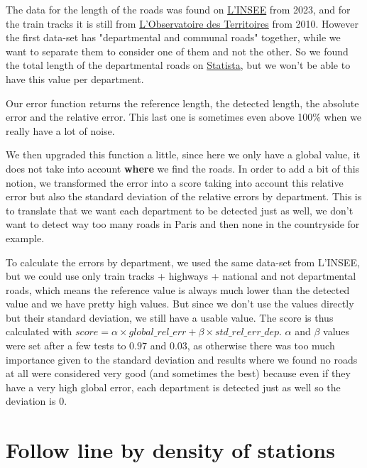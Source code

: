 \documentclass[main.tex]{subfiles}
\begin{document}
The data for the length of the roads was found on \href{https://www.insee.fr/fr/statistiques/2012705#tableau-TCRD_076_tab1_departements}{L'INSEE} from 2023, and for the train tracks it is still from \href{https://www.observatoire-des-territoires.gouv.fr/longueur-des-lignes-ferroviaires-en-service}{L'Observatoire des Territoires} from 2010. However the first data-set has "departmental and communal roads" together, while we want to separate them to consider one of them and not the other. So we found the total length of the departmental roads on \href{https://fr.statista.com/statistiques/540868/longueur-routes-france-par-type/}{Statista}, but we won't be able to have this value per department.

Our error function returns the reference length, the detected length, the absolute error and the relative error. This last one is sometimes even above 100\% when we really have a lot of noise. 

\hfill

We then upgraded this function a little, since here we only have a global value, it does not take into account \textbf{where} we find the roads. In order to add a bit of this notion, we transformed the error into a score taking into account this relative error but also the standard deviation of the relative errors by department. This is to translate that we want each department to be detected just as well, we don't want to detect way too many roads in Paris and then none in the countryside for example. 

To calculate the errors by department, we used the same data-set from L'INSEE, but we could use only train tracks + highways + national and not departmental roads, which means the reference value is always much lower than the detected value and we have pretty high values. But since we don't use the values directly but their standard deviation, we still have a usable value. The score is thus calculated with $score = \alpha \times global\_rel\_err + \beta \times std\_rel\_err\_dep$. $\alpha$ and $\beta$ values were set after a few tests to $0.97$ and $0.03$, as otherwise there was too much importance given to the standard deviation and results where we found no roads at all were considered very good (and sometimes the best) because even if they have a very high global error, each department is detected just as well so the deviation is 0. 


\section{Follow line by density of stations}
\end{document}
